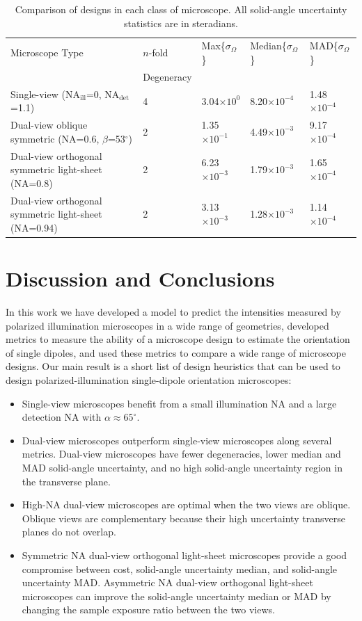\documentclass[10pt]{article}
\begin{document}
\begin{table}[ht!]
\centering
\caption{Comparison of designs in each class of microscope. All solid-angle
  uncertainty statistics are in steradians.}
\begin{tabular}{lllll}
  \toprule

  Microscope Type&$n$-fold&Max\{$\sigma_{\Omega}$\}&Median\{$\sigma_{\Omega}$\}&MAD\{$\sigma_{\Omega}$\}\\ 
    &Degeneracy&&&\\\midrule
Single-view (NA${}_\textrm{ill}$=0, NA${}_\textrm{det}$=1.1)&4&3.04$\times 10^{0}$&8.20$\times 10^{-4}$&1.48$\times 10^{-4}$ \\ 
  Dual-view oblique symmetric (NA=0.6, $\beta$=53${}^{\circ}$)&2&1.35$\times 10^{-1}$&4.49$\times 10^{-3}$&9.17$\times 10^{-4}$\\
Dual-view orthogonal symmetric light-sheet (NA=0.8)&2&6.23$\times 10^{-3}$&1.79$\times 10^{-3}$&1.65$\times 10^{-4}$\\  
Dual-view orthogonal symmetric light-sheet (NA=0.94)&2&3.13$\times 10^{-3}$&1.28$\times 10^{-3}$&1.14$\times 10^{-4}$\\
\bottomrule
\end{tabular}
\end{table}

\section{Discussion and Conclusions}\label{discussion}
In this work we have developed a model to predict the intensities measured by
polarized illumination microscopes in a wide range of geometries, developed
metrics to measure the ability of a microscope design to estimate the
orientation of single dipoles, and used these metrics to compare a wide
range of microscope designs. Our main result is a short list of design
heuristics that can be used to design polarized-illumination single-dipole
orientation microscopes:
\begin{itemize}
\item Single-view microscopes benefit from a small illumination NA and a large
  detection NA with $\alpha \approx 65^{\circ}$.
\item Dual-view microscopes outperform single-view microscopes along several
  metrics. Dual-view microscopes have fewer degeneracies, lower median and MAD
  solid-angle uncertainty, and no high solid-angle uncertainty region in the
  transverse plane.
\item High-NA dual-view microscopes are optimal when the two views are
  oblique. Oblique views are complementary because their high uncertainty
  transverse planes do not overlap.
\item Symmetric NA dual-view orthogonal light-sheet microscopes provide a good
  compromise between cost, solid-angle uncertainty median, and solid-angle
  uncertainty MAD. Asymmetric NA dual-view orthogonal light-sheet microscopes
  can improve the solid-angle uncertainty median or MAD by changing the sample
  exposure ratio between the two views.
\end{itemize}
\end{document}
